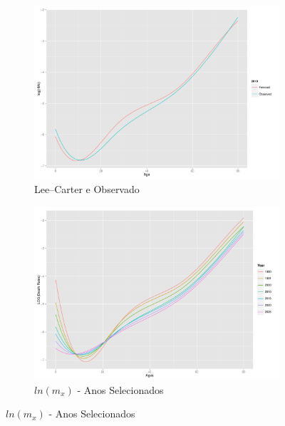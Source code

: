 \documentclass[12pt, 						%
			openright, 					%
			twoside,					%
			a4paper,x					%
			english,					%
			brazil]{abntex2}				%
\begin{document}
	\begin{figure}[!htb]
	\caption{\label{fig4} Validação do Modelo e Taxas projetadas}
		\begin{subfigure}[b]{0.5\textwidth}
		\begin{center}
			\caption{\label{fig4.1} Lee--Carter e Observado}
			\includegraphics[width=\textwidth]{Graphs/DR_validation.pdf}
		\end{center}
		\end{subfigure}
	\hfill
		\begin{subfigure}[b]{0.5\textwidth}
		\begin{center}
			\caption{\label{fig4.2} $ln(m_{x})$ - Anos Selecionados}
			\includegraphics[width=\textwidth]{Graphs/DR_select.pdf}
		\end{center}
 		\end{subfigure}
	\end{figure} \\
\end{document}

